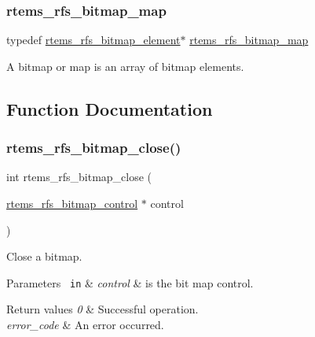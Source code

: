 \subsubsection{\texorpdfstring{rtems\_rfs\_bitmap\_map}{rtems\_rfs\_bitmap\_map}}
{\footnotesize\ttfamily typedef \mbox{\hyperlink{rtems-rfs-bitmaps_8h_a2e909e0a0c9759ac71ca69851253b905}{rtems\+\_\+rfs\+\_\+bitmap\+\_\+element}}$\ast$ \mbox{\hyperlink{rtems-rfs-bitmaps_8h_ad7417fa816b1cfccbc03fc564a5b341b}{rtems\+\_\+rfs\+\_\+bitmap\+\_\+map}}}

A bitmap or map is an array of bitmap elements. 

\subsection{Function Documentation}
\mbox{\label{rtems-rfs-bitmaps_8h_a9c5c4b4e9f3e518b9b1d9bed4824c67c}} 
\subsubsection{\texorpdfstring{rtems\_rfs\_bitmap\_close()}{rtems\_rfs\_bitmap\_close()}}
{\footnotesize\ttfamily int rtems\+\_\+rfs\+\_\+bitmap\+\_\+close (\begin{DoxyParamCaption}\item[{\mbox{\hyperlink{rtems-rfs-bitmaps_8h_aa1b1de5abc294444428eb1038d7f898b}{rtems\+\_\+rfs\+\_\+bitmap\+\_\+control}} $\ast$}]{control }\end{DoxyParamCaption})}

Close a bitmap.


\begin{DoxyParams}[1]{Parameters}
\mbox{\texttt{ in}}  & {\em control} & is the bit map control.\\
\hline
\end{DoxyParams}

\begin{DoxyRetVals}{Return values}
{\em 0} & Successful operation. \\
\hline
{\em error\+\_\+code} & An error occurred. \\
\hline
\end{DoxyRetVals}
\mbox{\label{rtems-rfs-bitmaps_8h_a4023169caad628bff0943dbfde9a23a9}} 
